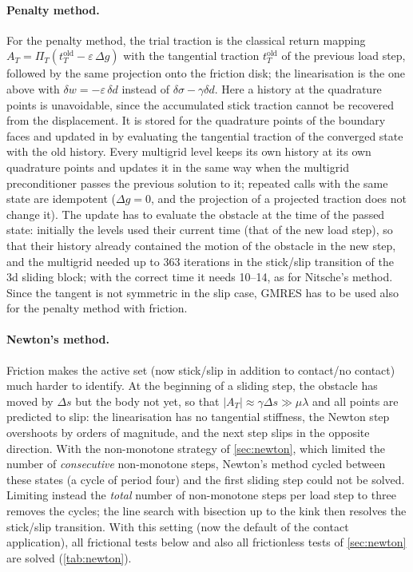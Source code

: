 \documentclass[11pt,a4paper]{article}
\begin{document}
\paragraph{Penalty method.}
For the penalty method, the trial traction is the classical return mapping
$A_T = \Pi_T(t_T^{\mathrm{old}} - \varepsilon\,\Delta g)$ with the tangential traction
$t_T^{\mathrm{old}}$ of the previous load step, followed by the same projection onto the friction
disk; the linearisation is the one above with $\delta w = -\varepsilon\,\delta d$ instead of
$\delta\sigma - \gamma\delta d$. Here a history at the quadrature points is unavoidable, since the
accumulated stick traction cannot be recovered from the displacement. It is stored for the
quadrature points of the boundary faces and updated in  by evaluating
the tangential traction of the converged state with the old history. Every multigrid level keeps
its own history at its own quadrature points and updates it in the same way when the multigrid
preconditioner passes the previous solution to it; repeated calls with the same state are
idempotent ($\Delta g=0$, and the projection of a projected traction does not change it). The
update has to evaluate the obstacle at the time of the passed state: initially the levels used
their current time (that of the new load step), so that their history already contained the
motion of the obstacle in the new step, and the multigrid needed up to 363 iterations in the
stick/slip transition of the 3d sliding block; with the correct time it needs 10--14, as for
Nitsche's method. Since the tangent is not symmetric in the slip case, GMRES has to be used also
for the penalty method with friction.

\paragraph{Newton's method.}
Friction makes the active set (now stick/slip in addition to contact/no contact) much harder to
identify. At the beginning of a sliding step, the obstacle has moved by $\Delta s$ but the body not
yet, so that $|A_T|\approx\gamma\Delta s\gg\mu\lambda$ and all points are predicted to slip: the
linearisation has no tangential stiffness, the Newton step overshoots by orders of magnitude, and
the next step slips in the opposite direction. With the non-monotone strategy of
\cref{sec:newton}, which limited the number of \emph{consecutive} non-monotone steps, Newton's
method cycled between these states (a cycle of period four) and the first sliding step could not
be solved. Limiting instead the \emph{total} number of non-monotone steps per load step to three
removes the cycles; the line search with bisection up to the kink then resolves the stick/slip
transition. With this setting (now the default of the contact application), all frictional tests
below and also all frictionless tests of \cref{sec:newton} are solved
(\cref{tab:newton}).
\end{document}
